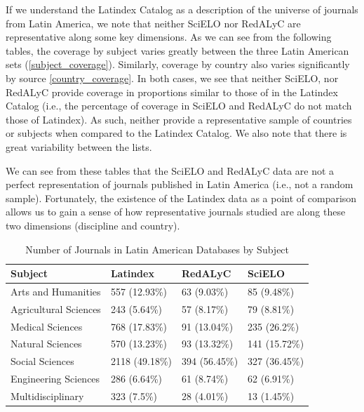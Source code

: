 If we understand the Latindex Catalog as a description of the universe of journals from Latin America, we note that neither SciELO nor RedALyC are representative along some key dimensions. As we can see from the following tables, the coverage by subject varies greatly between the three Latin American sets (\autoref{subject_coverage}). Similarly, coverage by country also varies significantly by source \autoref{country_coverage}. In both cases, we see that neither SciELO, nor RedALyC provide coverage in proportions similar to those of in the Latindex Catalog (i.e., the percentage of coverage in SciELO and RedALyC do not match those of Latindex). As such, neither provide a representative sample of countries or subjects when compared to the Latindex Catalog. We also note that there is great variability between the lists.

We can see from these tables that the SciELO and RedALyC data are not a perfect representation of journals published in Latin America (i.e., not a random sample). Fortunately, the existence of the Latindex data as a point of comparison allows us to gain a sense of how representative journals studied are along these two dimensions (discipline and country).


\begin{table}[!htbp]
\centering
\caption{Number of Journals in Latin American Databases by Subject} \label{subject_coverage}
\begin{tabular}{@{}llll@{}}
\toprule
Subject               & Latindex       & RedALyC       & SciELO        \\ \midrule
Arts and Humanities   & 557 (12.93\%)  & 63 (9.03\%)   & 85 (9.48\%)   \\
Agricultural Sciences & 243 (5.64\%)   & 57 (8.17\%)   & 79 (8.81\%)   \\
Medical Sciences      & 768 (17.83\%)  & 91 (13.04\%)  & 235 (26.2\%)  \\
Natural Sciences      & 570 (13.23\%)  & 93 (13.32\%)  & 141 (15.72\%) \\
Social Sciences       & 2118 (49.18\%) & 394 (56.45\%) & 327 (36.45\%) \\
Engineering Sciences  & 286 (6.64\%)   & 61 (8.74\%)   & 62 (6.91\%)   \\
Multidisciplinary     & 323 (7.5\%)    & 28 (4.01\%)   & 13 (1.45\%)   \\ \bottomrule
\end{tabular}
\end{table}

